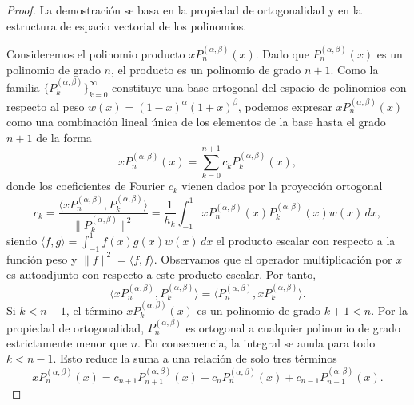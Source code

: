 \documentclass[12pt,a4paper]{book}
\begin{document}
\begin{proof}
La demostración se basa en la propiedad de ortogonalidad y en la estructura de espacio vectorial de los polinomios.

Consideremos el polinomio producto $x P_n^{(\alpha, \beta)}(x)$. Dado que $P_n^{(\alpha, \beta)}(x)$ es un polinomio de grado $n$, el producto es un polinomio de grado $n+1$.
Como la familia $\{ P_k^{(\alpha, \beta)} \}_{k=0}^{\infty}$ constituye una base ortogonal del espacio de polinomios con respecto al peso $w(x) = (1-x)^\alpha(1+x)^\beta$, podemos expresar $x P_n^{(\alpha, \beta)}(x)$ como una combinación lineal única de los elementos de la base hasta el grado $n+1$ de la forma
\[
x P_n^{(\alpha, \beta)}(x) = \sum_{k=0}^{n+1} c_k P_k^{(\alpha, \beta)}(x),
\]
donde los coeficientes de Fourier $c_k$ vienen dados por la proyección ortogonal
\[
c_k = \frac{\langle x P_n^{(\alpha, \beta)}, P_k^{(\alpha, \beta)} \rangle}{\| P_k^{(\alpha, \beta)} \|^2} = \frac{1}{h_k} \int_{-1}^{1} x P_n^{(\alpha, \beta)}(x) P_k^{(\alpha, \beta)}(x) w(x) \, dx,
\]
siendo $\langle f, g \rangle = \int_{-1}^1 f(x)g(x)w(x) \, dx$ el producto escalar con respecto a la función peso y $\|f\|^2 = \langle f, f \rangle$.
Observamos que el operador multiplicación por $x$ es autoadjunto con respecto a este producto escalar. Por tanto,
\[
\langle x P_n^{(\alpha, \beta)}, P_k^{(\alpha, \beta)} \rangle = \langle P_n^{(\alpha, \beta)}, x P_k^{(\alpha, \beta)} \rangle.
\]
Si $k < n-1$, el término $x P_k^{(\alpha, \beta)}(x)$ es un polinomio de grado $k+1 < n$. Por la propiedad de ortogonalidad, $P_n^{(\alpha, \beta)}$ es ortogonal a cualquier polinomio de grado estrictamente menor que $n$. En consecuencia, la integral se anula para todo $k < n-1$.
Esto reduce la suma a una relación de solo tres términos 
\begin{equation}
\label{eq:expansion_fourier}
x P_n^{(\alpha, \beta)}(x) = c_{n+1} P_{n+1}^{(\alpha, \beta)}(x) + c_n P_n^{(\alpha, \beta)}(x) + c_{n-1} P_{n-1}^{(\alpha, \beta)}(x).
\end{equation}


\end{proof}
\end{document}
